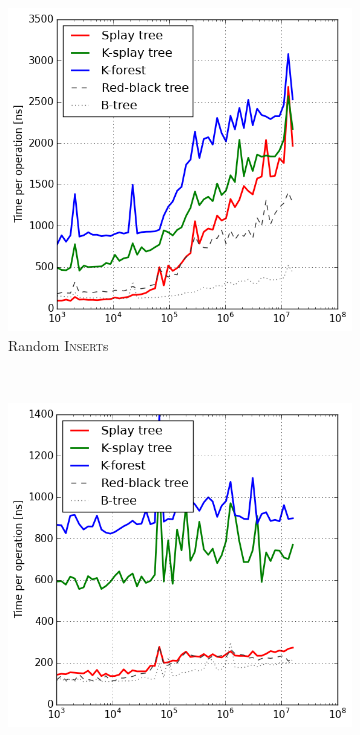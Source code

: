 \begin{figure}
\begin{subfigure}[t]{0.31\textwidth}
	\includegraphics[width=\textwidth]{img/performance/self-adj-random-insert}
	\caption{Random \textsc{Insert}s}
\end{subfigure}
~
\begin{subfigure}[t]{0.31\textwidth}
	\includegraphics[width=\textwidth]{img/performance/self-adj-ws-1k}

\end{subfigure}
\end{figure}
